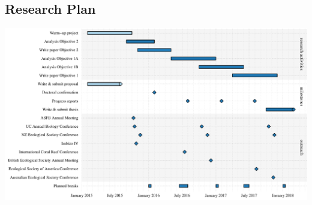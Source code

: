 \documentclass[a4paper]{article}
\begin{document}
\begin{landscape}
\section{Research Plan}
\includegraphics{schedule}
\end{landscape}

\twocolumn
\printbibliography
\end{document}
